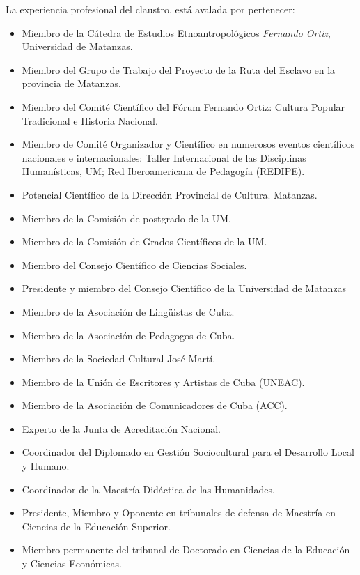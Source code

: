 La experiencia profesional del claustro, está avalada por pertenecer: 

\begin{itemize}
	\item Miembro de la Cátedra de Estudios Etnoantropológicos \emph{Fernando Ortiz}, Universidad de Matanzas.
	\item Miembro del Grupo de Trabajo del Proyecto de la Ruta del Esclavo en la provincia de Matanzas.
	\item Miembro del Comité Científico del Fórum Fernando Ortiz: Cultura Popular Tradicional e Historia Nacional.
	\item Miembro de Comité Organizador y Científico en numerosos eventos científicos nacionales e internacionales: Taller Internacional de las Disciplinas Humanísticas, UM; Red Iberoamericana de Pedagogía (REDIPE).
	\item Potencial Científico de la Dirección Provincial de Cultura. Matanzas.
	\item Miembro de la Comisión de postgrado de la UM.
	\item Miembro de la Comisión de Grados Científicos de la UM.
	\item Miembro del Consejo Científico de Ciencias Sociales.
	\item Presidente y miembro del Consejo Científico de la Universidad de Matanzas
	\item Miembro de la Asociación de Lingüistas de Cuba.
	\item Miembro de la Asociación de Pedagogos de Cuba.
	\item Miembro de la Sociedad Cultural José Martí.
	\item Miembro de la Unión de Escritores y Artistas de Cuba (UNEAC).
	\item Miembro de la Asociación de Comunicadores de Cuba (ACC).
	\item Experto de la Junta de Acreditación Nacional.
	\item Coordinador del Diplomado en Gestión Sociocultural para el Desarrollo Local y Humano.
	\item Coordinador de la Maestría Didáctica de las Humanidades.
	\item Presidente, Miembro y Oponente en tribunales de defensa de Maestría en Ciencias de la Educación Superior.
	\item Miembro permanente del tribunal de Doctorado en Ciencias de la Educación y Ciencias Económicas.
\end{itemize}
